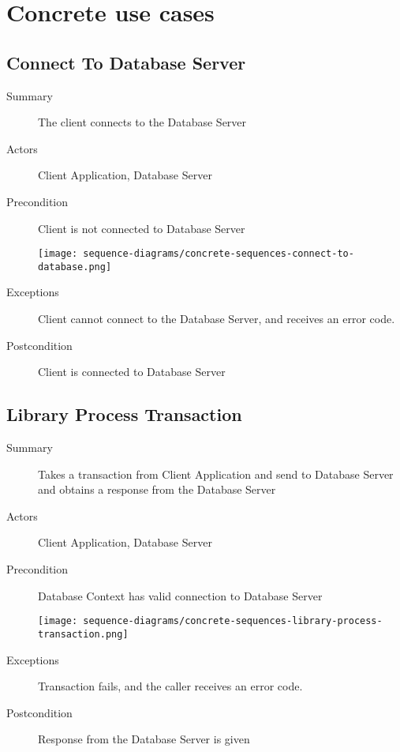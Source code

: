 \documentclass[a4paper]{report}
\begin{document}
\section{Concrete use cases}

	\subsection{Connect To Database Server}

	\begin{description}
		\item[Summary] The client connects to the Database Server
		\item[Actors] Client Application, Database Server
		\item[Precondition] Client is not connected to Database Server

		\begin{center}
			\texttt{[image: sequence-diagrams/concrete-sequences-connect-to-database.png]}
		\end{center}

		\item[Exceptions] Client cannot connect to the Database Server, and receives an error code.
		\item[Postcondition] Client is connected to Database Server
	\end{description}

	\pagebreak
	
	\subsection{Library Process Transaction}

	\begin{description}
		\item[Summary] Takes a transaction from Client Application and send to Database Server and obtains a response from the Database Server
		\item[Actors] Client Application, Database Server
		\item[Precondition] Database Context has valid connection to Database Server

		\begin{center}
			\texttt{[image: sequence-diagrams/concrete-sequences-library-process-transaction.png]}
		\end{center}

		\item[Exceptions] Transaction fails, and the caller receives an error code.
		\item[Postcondition] Response from the Database Server is given
	\end{description}
	
\end{document}
